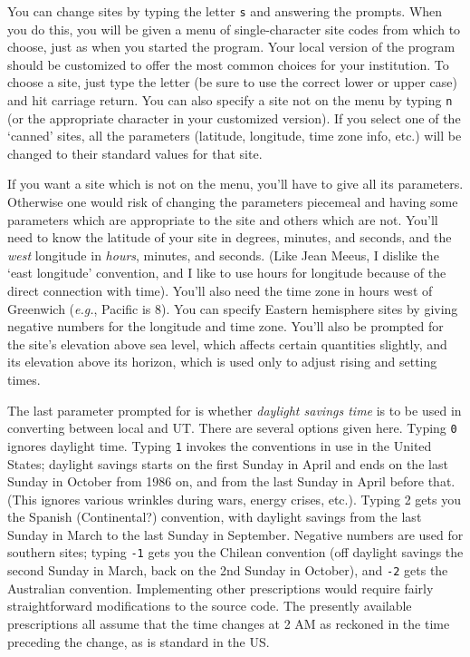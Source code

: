 You can change sites by typing the letter {\tt s} and answering the prompts.
When you do this, you will be given a menu of single-character 
site codes from which to choose, just as when you started the program.
Your local version
of the program should be customized to offer the most
common choices for your institution.  To choose a site, just
type the letter (be sure to use the correct lower or upper
case) and hit carriage return.  You can also specify 
a site not on the menu by typing {\tt n} (or the appropriate character
in your customized version).
If you select one of the `canned' sites, all the parameters
(latitude, longitude, time zone info, etc.) will be changed to
their standard values for that site.
\par
If you want a site which is not on the menu, you'll have to give
all its parameters.  Otherwise one would risk of changing 
the parameters piecemeal and having some parameters which are appropriate
to the site and others which are not.  You'll need to know the 
latitude of your site in degrees, minutes, and seconds, 
and the {\it west} longitude in {\it hours}, minutes, and seconds.
(Like Jean Meeus, I dislike the `east longitude' convention, and I
like to use hours for longitude because of the direct connection
with time).
You'll also need the time zone in hours west of Greenwich ({\it e.g.},
Pacific is 8).  You can specify Eastern hemisphere sites by giving
negative numbers for the longitude and time zone.  You'll also be
prompted for the site's elevation above sea level, which 
affects certain quantities slightly, and its
elevation above its horizon, which is used only
to adjust rising and setting times.
\par
The last parameter prompted for is whether {\it daylight
savings time} is to be used in converting between local and UT.  There
are several options given here.  Typing {\tt 0} ignores daylight
time.  Typing {\tt 1} invokes the conventions in use in the
United States; daylight savings starts on the first
Sunday in April and ends on the last Sunday in October from 1986 on,
and from the last Sunday in April before that.  (This ignores
various wrinkles during wars, energy crises, etc.).  Typing 2 gets
you the Spanish (Continental?) convention, with daylight
savings from the last Sunday in March to the last Sunday
in September.  Negative numbers are used for southern sites; 
typing {\tt -1} gets you the Chilean convention
(off daylight savings the second Sunday in March, back
on the 2nd Sunday in October), and {\tt -2} gets the
Australian convention.  Implementing other prescriptions would require 
fairly straightforward modifications
to the source code.  The presently available prescriptions all assume
that the time changes at 2 AM as reckoned in the time preceding the
change, as is standard in the US.

